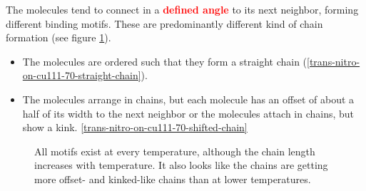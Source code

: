	The molecules tend to connect in a \textbf{\textcolor{red}{defined angle}} to its next neighbor, forming different binding motifs. These are predominantly different kind of chain formation (see figure \ref{fig:two-leg-trans-cu111-motifs}).
	\begin{itemize}
		\item The molecules are ordered such that they form a straight chain (\autoref{trans-nitro-on-cu111-70-straight-chain}).
		\item The molecules arrange in chains, but each molecule has an offset of about a half of its width to the next neighbor or the molecules attach in chains, but show a kink. \autoref{trans-nitro-on-cu111-70-shifted-chain}
	\end{itemize}
	
	\begin{figure}[h]
		\centering
		 \qquad
		\caption{All motifs exist at every temperature, although the chain length increases with temperature. It also looks like the chains are getting more offset- and kinked-like chains than at lower temperatures.}
		\label{fig:two-leg-trans-cu111-motifs}
	\end{figure}
	
